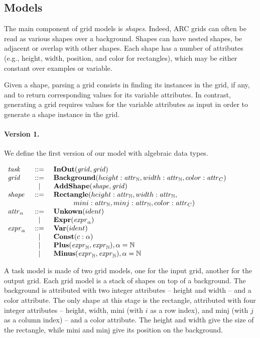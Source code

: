 \documentclass[a4paper]{llncs}
\newenvironment{datatype}{$\begin{array}{lcl}}{\end{array}$}
\newcommand{\is}{&\ ::=\ &}
\newcommand{\altis}{\\ &\ \mid\ &}
\newcommand{\nat}{\mathbb{N}}
\begin{document}
\subsection{Models}
\label{model}

The main component of grid models is {\em shapes}. Indeed, ARC grids
can often be read as various shapes over a background. Shapes can have
nested shapes, be adjacent or overlap with other shapes. Each shape
has a number of attributes (e.g., height, width, position, and color
for rectangles), which may be either constant over examples or
variable.

Given a shape, parsing a grid consists in finding its instances in the
grid, if any, and to return corresponding values for its variable
attributes. In contrast, generating a grid requires values for the
variable attributes as input in order to generate a shape instance in
the grid.

\paragraph{Version 1.} We define the first version of our model with
algebraic data types. 

\begin{center}
\begin{datatype}
  {\it task} \is {\bf InOut}({\it grid}, {\it grid})
  \\
  {\it grid} \is {\bf Background}(height: {\it attr}_\nat, width: {\it attr}_\nat, color: {\it attr}_C)
  \altis {\bf AddShape}({\it shape}, {\it grid})
  \\
  {\it shape} \is {\bf Rectangle}(height: {\it attr}_\nat, width: {\it attr}_\nat,\\
  & & \hspace*{1cm} mini: {\it attr}_\nat, minj: {\it attr}_\nat, color: {\it attr}_C)
  \\
  {\it attr}_\alpha \is {\bf Unkown}(ident)
  \altis {\bf Expr}({\it expr}_\alpha)
  \\
  {\it expr}_\alpha \is {\bf Var}(ident)
  \altis {\bf Const}(c: \alpha)
  \altis {\bf Plus}({\it expr}_\nat, {\it expr}_\nat), \alpha = \nat
  \altis {\bf Minus}({\it expr}_\nat, {\it expr}_\nat), \alpha = \nat
\end{datatype}
\end{center}

A task model is made of two grid models, one for the input grid,
another for the output grid.
%
Each grid model is a stack of shapes on top of a background. The
background is attributed with two integer attributes -- height and
width -- and a color attribute.
%
The only shape at this stage is the rectangle, attributed with four
integer attributes -- height, width, mini (with $i$ as a row index),
and minj (with $j$ as a column index) -- and a color attribute. The
height and width give the size of the rectangle, while mini and minj
give its position on the background.
\end{document}

